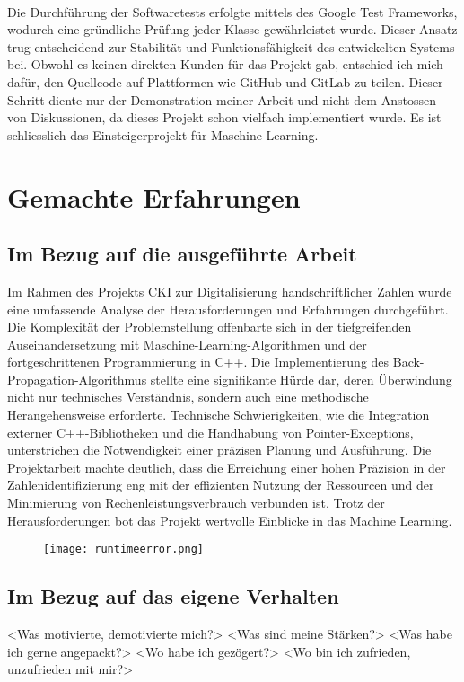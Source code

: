 \\
Die Durchführung der Softwaretests erfolgte mittels des Google Test Frameworks, wodurch eine gründliche Prüfung jeder Klasse gewährleistet wurde. Dieser Ansatz trug entscheidend zur Stabilität und Funktionsfähigkeit des entwickelten Systems bei. Obwohl es keinen direkten Kunden für das Projekt gab, entschied ich mich dafür, den Quellcode auf Plattformen wie GitHub und GitLab zu teilen. Dieser Schritt diente nur der Demonstration meiner Arbeit und nicht dem Anstossen von Diskussionen, da dieses Projekt schon vielfach implementiert wurde. Es ist schliesslich das Einsteigerprojekt für Maschine Learning.

\section{Gemachte Erfahrungen}
\subsection{Im Bezug auf die ausgeführte Arbeit}
Im Rahmen des Projekts CKI zur Digitalisierung handschriftlicher Zahlen wurde eine umfassende Analyse der Herausforderungen und Erfahrungen durchgeführt. Die Komplexität der Problemstellung offenbarte sich in der tiefgreifenden Auseinandersetzung mit Maschine-Learning-Algorithmen und der fortgeschrittenen Programmierung in C++. Die Implementierung des Back-Propagation-Algorithmus stellte eine signifikante Hürde dar, deren Überwindung nicht nur technisches Verständnis, sondern auch eine methodische Herangehensweise erforderte. Technische Schwierigkeiten, wie die Integration externer C++-Bibliotheken und die Handhabung von Pointer-Exceptions, unterstrichen die Notwendigkeit einer präzisen Planung und Ausführung. Die Projektarbeit machte deutlich, dass die Erreichung einer hohen Präzision in der Zahlenidentifizierung eng mit der effizienten Nutzung der Ressourcen und der Minimierung von Rechenleistungsverbrauch verbunden ist. Trotz der Herausforderungen bot das Projekt wertvolle Einblicke in das Machine Learning.
\begin{figure}[htbp]
	\centering
		\texttt{[image: runtimeerror.png]}
	\label{fig:runtimeerror}
\end{figure}

\subsection{Im Bezug auf das eigene Verhalten}
<Was motivierte, demotivierte mich?>
<Was sind meine Stärken?>
<Was habe ich gerne angepackt?>
<Wo habe ich gezögert?>
<Wo bin ich zufrieden, unzufrieden mit mir?>

